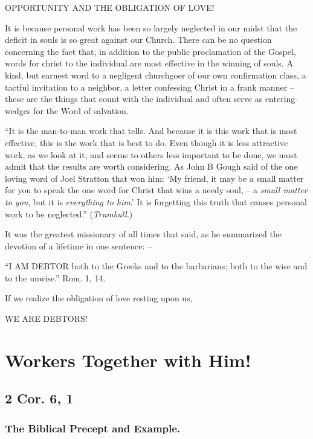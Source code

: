 \documentclass[
]{book}
\begin{document}
\begin{center} OPPORTUNITY AND THE OBLIGATION OF LOVE! \end{center}

It is because personal work has been so largely neglected in our midst that the deficit in souls is so great against our Church. There can be no question concerning the fact that, in addition to the public proclamation of the Gospel, words for christ to the individual are most effective in the winning of souls. A kind, but earnest word to a negligent churchgoer of our own confirmation class, a tactful invitation to a neighbor, a letter confessing Christ in a frank manner -- these are the things that count with the individual and often serve as entering-wedges for the Word of salvation.

``It is the man-to-man work that tells. And because it is this work that is most effective, this is the work that is best to do. Even though it is less attractive work, as we look at it, and seems to others less important to be done, we must admit that the results are worth considering. As John B Gough said of the one loving word of Joel Stratton that won him: `My friend, it may be a small matter for you to speak the one word for Christ that wins a needy soul, -- a \emph{small matter to you}, but it is \emph{everything to him}.' It is forgetting this truth that causes personal work to be neglected.'' (\emph{Trumbull}.)

It was the greatest missionary of all times that said, as he summarized the devotion of a lifetime in one sentence: --

``I AM DEBTOR both to the Greeks and to the barbarians; both to the wise and to the unwise.'' Rom. 1, 14.

If we realize the obligation of love resting upon us,

\begin{center} WE ARE DEBTORS! \end{center}

\chapter{Workers Together with Him!}\label{workers-together-with-him}

\section*{2 Cor. 6, 1}\label{cor.-6-1}

\subsection*{The Biblical Precept and Example.}\label{the-biblical-precept-and-example.}
\end{document}

